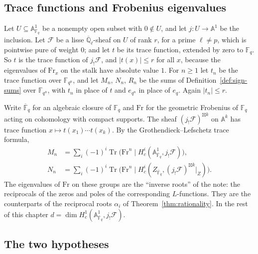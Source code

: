 \documentclass[11pt]{amsbook}
\theoremstyle{plain}
\theoremstyle{definition}
\theoremstyle{remark}
\numberwithin{equation}{section}
\numberwithin{figure}{chapter}
\numberwithin{table}{chapter}
\newcommand{\Q}{\mathbb{Q}}
\newcommand{\F}{\mathbb{F}}
\newcommand{\Fr}{\mathrm{Fr}}
\newcommand{\Fb}{\overline{\F}_q}
\newcommand{\Tr}{\operatorname{Tr}}
\newcommand{\cF}{\mathcal{F}}
\begin{document}
\subsection{Trace functions and Frobenius eigenvalues}

Let $U \subseteq \mathbb{A}^1_{\F_q}$ be a nonempty open subset
with $0 \notin U$, and let $j \colon U \to \mathbb{A}^1$ be the
inclusion. Let $\cF$ be a lisse $\overline{\Q}_\ell$-sheaf on $U$
of rank $r$, for a prime $\ell\ne p$, which is pointwise pure of
weight $0$; and let $t$ be its trace function, extended by zero to
$\F_q$. So $t$ is the trace function of $j_!\cF$, and
$|t(x)| \le r$ for all $x$, because the eigenvalues of $\Fr_x$ on
the stalk have absolute value $1$. For $n\ge1$ let $t_n$ be the
trace function over $\F_{q^n}$, and let $M_n$, $N_n$, $R_n$ be the
sums of Definition~\ref{def:sign-sums} over $\F_{q^n}$, with
$t_n$ in place of $t$ and $e_{q^n}$ in place of $e_q$. Again
$|t_n|\le r$.

Write $\Fb$ for an algebraic closure of $\F_q$ and $\Fr$ for the
geometric Frobenius of $\F_q$ acting on cohomology with compact
supports. The sheaf $(j_!\cF)^{\boxtimes k}$ on $\mathbb A^k$ has
trace function $x\mapsto t(x_1)\cdots t(x_k)$. By the
Grothendieck--Lefschetz trace formula,
\begin{equation}\label{eq:sign-trace}
\begin{aligned}
  M_n &= \sum_i (-1)^i \Tr\bigl(\Fr^n \mid
  H^i_c(\mathbb{A}^1_{\Fb}, j_!\cF)\bigr),\\
  N_n &= \sum_i (-1)^i \Tr\bigl(\Fr^n \mid
  H^i_c(Z_{\Fb}, (j_!\cF)^{\boxtimes k}|_Z)\bigr).
\end{aligned}
\end{equation}
The eigenvalues of $\Fr$ on these groups are the ``inverse roots''
of the note: the reciprocals of the zeros and poles of the
corresponding $L$-functions. They are the counterparts of the
reciprocal roots $\alpha_i$ of Theorem~\ref{thm:rationality}. In
the rest of this chapter
$d=\dim H^1_c(\mathbb{A}^1_{\Fb}, j_!\cF)$.

\subsection{The two hypotheses}
\end{document}
